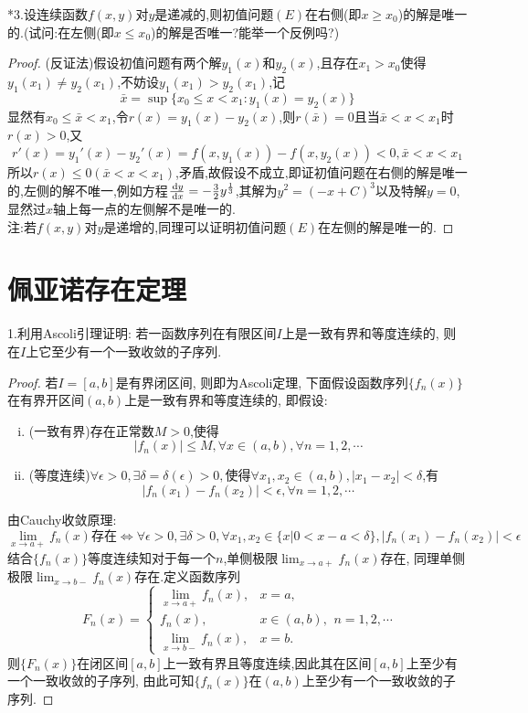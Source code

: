 *3.设连续函数$f(x,y)$对$y$是递减的,则初值问题$(E)$在右侧(即$x\geq x_0$)的解是唯一的.(试问:在左侧(即$x\leq x_0$)的解是否唯一?能举一个反例吗?)
\begin{proof}
(反证法)假设初值问题有两个解$y_1(x)$和$y_2(x)$,且存在$x_1>x_0$使得$y_1(x_1)\neq y_2(x_1)$,不妨设$y_1(x_1)>y_2(x_1)$,记
\[\bar{x}=\sup\{x_0\leq x<x_1:y_1(x)=y_2(x)\}\]
显然有$x_0\leq\bar{x}<x_1$,令$r(x)=y_1(x)-y_2(x)$,则$r(\bar{x})=0$且当$\bar{x}<x<x_1$时$r(x)>0$,又
\[r'(x)=y_1'(x)-y_2'(x)=f(x,y_1(x))-f(x,y_2(x))<0,\bar{x}<x<x_1\]
所以$r(x)\leq0(\bar{x}<x<x_1)$,矛盾,故假设不成立,即证初值问题在右侧的解是唯一的,左侧的解不唯一,例如方程$\frac{\,\mathrm{d} y}{\,\mathrm{d} x}=-\frac{3}{2}y^{\frac{1}{3}}$,其解为$y^2=(-x+C)^3$以及特解$y=0$,显然过$x$轴上每一点的左侧解不是唯一的.\\
注:若$f(x,y)$对$y$是递增的,同理可以证明初值问题$(E)$在左侧的解是唯一的.
\end{proof}


\section{佩亚诺存在定理}


1.利用Ascoli引理证明: 若一函数序列在有限区间$I$上是一致有界和等度连续的, 则在$I$上它至少有一个一致收敛的子序列.

\begin{proof}
若$I=[a,b]$是有界闭区间, 则即为Ascoli定理, 下面假设函数序列$\{f_n(x)\}$在有界开区间$(a,b)$上是一致有界和等度连续的, 即假设:
\begin{enumerate}[(i)]
\item (一致有界)存在正常数$M>0$,使得
\[|f_n(x)|\leq M,\forall x\in(a,b),\forall n=1,2,\cdots\]
\item (等度连续)$\forall\epsilon>0,\exists\delta=\delta(\epsilon)>0,$使得$\forall x_1,x_2\in(a,b),|x_1-x_2|<\delta$,有
\[|f_n(x_1)-f_n(x_2)|<\epsilon,\forall n=1,2,\cdots\]
\end{enumerate}
由Cauchy收敛原理:
\[\lim_{x\to a+}f_n(x)存在\Leftrightarrow\forall\epsilon>0,\exists\delta>0,\forall x_1,x_2\in\{x|0<x-a<\delta\},|f_n(x_1)-f_n(x_2)|<\epsilon\]
结合$\{f_n(x)\}$等度连续知对于每一个$n$,单侧极限$\displaystyle\lim_{x\to a+}f_n(x)$存在, 
同理单侧极限$\displaystyle\lim_{x\to b-}f_n(x)$存在.定义函数序列
\[F_n(x)=\begin{cases}
\lim\limits_{x\to a+}f_n(x),&x=a,\\
f_n(x),&x\in (a,b),\\
\lim\limits_{x\to b-}f_n(x),&x=b.
\end{cases}n=1,2,\cdots\]
则$\{F_n(x)\}$在闭区间$[a,b]$上一致有界且等度连续,因此其在区间$[a,b]$上至少有一个一致收敛的子序列,
由此可知$\{f_n(x)\}$在$(a,b)$上至少有一个一致收敛的子序列.
\end{proof}


